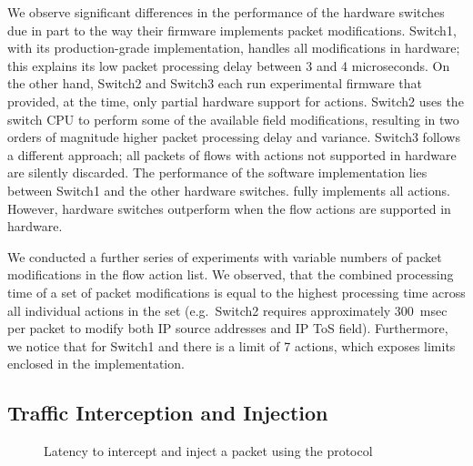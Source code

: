 
We observe significant differences in the performance of the hardware switches
due in part to the way their firmware implements packet modifications. Switch1,
with its production-grade implementation, handles all modifications in hardware;
this explains its low packet processing delay between 3 and 4 microseconds. On
the other hand, Switch2 and Switch3 each run experimental firmware that
provided, at the time, only partial hardware support for \of actions. Switch2
uses the switch CPU to perform some of the available field modifications,
resulting in two orders of magnitude higher packet processing delay and
variance.  Switch3 follows a different approach; all packets of flows with
actions not supported in hardware are silently discarded. The performance of the
\ovs software implementation lies between Switch1 and the other hardware
switches.  \ovs fully implements all \of actions. However, hardware switches
outperform \ovs when the flow actions are supported in hardware.

We conducted a further series of experiments with variable numbers of packet
modifications in the flow action list. We observed, that the combined processing
time of a set of packet modifications is equal to the highest processing time
across all individual actions in the set (e.g.~Switch2 requires approximately
300~msec per packet to modify both IP source addresses and IP ToS field).
Furthermore, we notice that for Switch1 and \ovs there is a limit of 7
actions, which exposes limits enclosed in the implementation.

\subsection{Traffic Interception and Injection}\label{sec:results-pktin}

\begin{figure}[ht]
  \begin{center}
  \end{center}
  \caption{Latency to intercept and inject a packet using the \of protocol}
  \label{fig:pkt_in_out_delay}
\end{figure}

